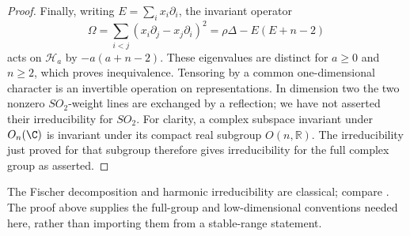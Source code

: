 \begin{proof}
Finally, writing \(E=\sum_i x_i\partial_i\), the invariant operator
\[
 \Omega=\sum_{i<j}(x_i\partial_j-x_j\partial_i)^2
             =\rho\Delta-E(E+n-2)
\]
acts on \(\mathcal H_a\) by \(-a(a+n-2)\).  These eigenvalues
are distinct for \(a\ge0\) and \(n\ge2\), which proves
inequivalence.  Tensoring by a common one-dimensional character is
an invertible operation on representations.  In dimension two the
two nonzero \(SO_2\)-weight lines are exchanged by a reflection;
we have not asserted their irreducibility for \(SO_2\).
For clarity, a complex subspace invariant under \(O_n(\C)\)
is invariant under its compact real subgroup \(O(n,\mathbb R)\).
The irreducibility just proved for that subgroup therefore gives
irreducibility for the full complex group as asserted.
\end{proof}

The Fischer decomposition and harmonic irreducibility are classical;
compare \cite[\S1, equations (1)--(3)]{DeBieEelbodeRoels}.
The proof above supplies the full-group and low-dimensional conventions
needed here, rather than importing them from a stable-range statement.
